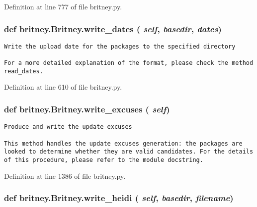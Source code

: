 Definition at line 777 of file britney.py.
\subsubsection{\setlength{\rightskip}{0pt plus 5cm}def britney.Britney.write\_\-dates ( {\em self},  {\em basedir},  {\em dates})}\label{classbritney_1_1Britney_83e0bd993e7a099e6bf89d760183a76b}




\footnotesize\begin{verbatim}Write the upload date for the packages to the specified directory

For a more detailed explanation of the format, please check the method
read_dates.
\end{verbatim}
\normalsize
 

Definition at line 610 of file britney.py.
\subsubsection{\setlength{\rightskip}{0pt plus 5cm}def britney.Britney.write\_\-excuses ( {\em self})}\label{classbritney_1_1Britney_010f6deffca32f7f71ecf1f5c1bb4985}




\footnotesize\begin{verbatim}Produce and write the update excuses

This method handles the update excuses generation: the packages are
looked to determine whether they are valid candidates. For the details
of this procedure, please refer to the module docstring.
\end{verbatim}
\normalsize
 

Definition at line 1386 of file britney.py.
\subsubsection{\setlength{\rightskip}{0pt plus 5cm}def britney.Britney.write\_\-heidi ( {\em self},  {\em basedir},  {\em filename})}\label{classbritney_1_1Britney_20f846da79d595d36628c8da3195ac7a}




